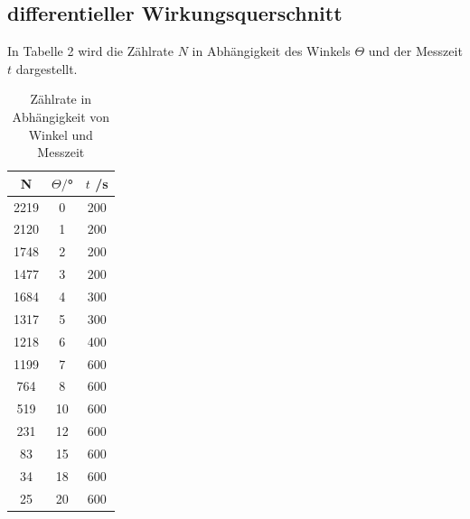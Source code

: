 \subsection{differentieller Wirkungsquerschnitt}
In Tabelle 2 wird die Zählrate $N$ in Abhängigkeit des Winkels $\Theta$ und der Messzeit $t$ dargestellt.


\begin{table}[H]
  \centering
  \caption{Zählrate in Abhängigkeit von Winkel und Messzeit}
  \label{tab:Parameter}
  \begin{tabular}{c c c}
    \toprule
    N & $\Theta/$° & $t$ /s\\
    \midrule
    2219 &  0 & 200 \\
    2120 &  1 & 200 \\
    1748 &  2 & 200 \\
    1477 &  3 & 200 \\
    1684 &  4 & 300 \\
    1317 &  5 & 300 \\
    1218 &  6 & 400 \\
    1199 &  7 & 600 \\
     764 &  8 & 600 \\
     519 & 10 & 600 \\
     231 & 12 & 600 \\
      83 & 15 & 600 \\
      34 & 18 & 600 \\
      25 & 20 & 600 \\
    \bottomrule
  \end{tabular}
\end{table}
